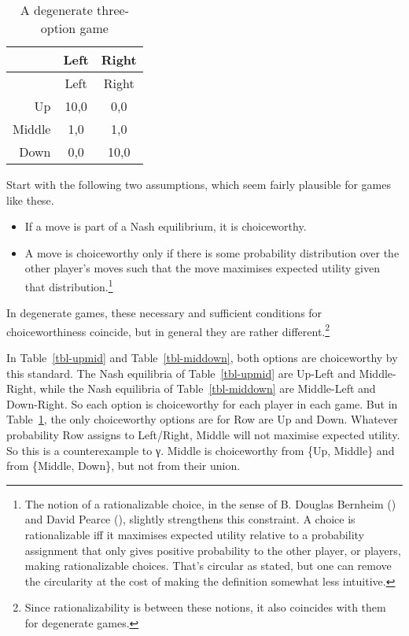 \documentclass[
  11pt,
  letterpaper,
  DIV=11,
  numbers=noendperiod,
  twoside]{scrartcl}
\providecommand{\tightlist}{%
  \setlength{\itemsep}{0pt}\setlength{\parskip}{0pt}}
\begin{document}
\begin{longtable}[]{@{}rcc@{}}
\caption{A degenerate three-option
game}\label{tbl-allthree}\tabularnewline
\toprule\noalign{}
& Left & Right \\
\midrule\noalign{}
\endfirsthead
\toprule\noalign{}
& Left & Right \\
\midrule\noalign{}
\endhead
\bottomrule\noalign{}
\endlastfoot
Up & 10,0 & 0,0 \\
Middle & 1,0 & 1,0 \\
Down & 0,0 & 10,0 \\
\end{longtable}

Start with the following two assumptions, which seem fairly plausible
for games like these.

\begin{itemize}
\tightlist
\item
  If a move is part of a Nash equilibrium, it is choiceworthy.
\item
  A move is choiceworthy only if there is some probability distribution
  over the other player's moves such that the move maximises expected
  utility given that distribution.\footnote{The notion of a
    rationalizable choice, in the sense of B. Douglas Bernheim
    () and David Pearce
    (), slightly strengthens this
    constraint. A choice is rationalizable iff it maximises expected
    utility relative to a probability assignment that only gives
    positive probability to the other player, or players, making
    rationalizable choices. That's circular as stated, but one can
    remove the circularity at the cost of making the definition somewhat
    less intuitive.}
\end{itemize}

In degenerate games, these necessary and sufficient conditions for
choiceworthiness coincide, but in general they are rather
different.\footnote{Since rationalizability is between these notions, it
  also coincides with them for degenerate games.}

In Table~\ref{tbl-upmid} and Table~\ref{tbl-middown}, both options are
choiceworthy by this standard. The Nash equilibria of
Table~\ref{tbl-upmid} are Up-Left and Middle-Right, while the Nash
equilibria of Table~\ref{tbl-middown} are Middle-Left and Down-Right. So
each option is choiceworthy for each player in each game. But in
Table~\ref{tbl-allthree}, the only choiceworthy options are for Row are
Up and Down. Whatever probability Row assigns to Left/Right, Middle will
not maximise expected utility. So this is a counterexample to γ. Middle
is choiceworthy from \{Up, Middle\} and from \{Middle, Down\}, but not
from their union.
\end{document}
